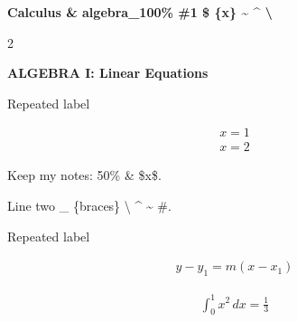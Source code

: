 \documentclass[a4paper]{article}
\begin{document}
\fontsize{9pt}{11.35pt}\selectfont
\setlength{\abovedisplayskip}{0pt}
\setlength{\belowdisplayskip}{0pt}
\setlength{\abovedisplayshortskip}{0pt}
\setlength{\belowdisplayshortskip}{0pt}
\setlength{\jot}{1pt}
\textbf{Calculus \& algebra\_100\% \#1 \$ \{x\} \textasciitilde{} \textasciicircum{} \textbackslash{}}\par
\begin{multicols}{2}
\raggedcolumns
\noindent\begin{minipage}{\linewidth}
\textbf{ALGEBRA I: Linear Equations}\par
Repeated label\par
\[\begin{gathered}
x=1\\
x=2
\end{gathered}\]
\end{minipage}\par\vspace{1pt}
Keep my notes: 50\% \& \$x\$.\par
Line two \_ \{braces\} \textbackslash{} \textasciicircum{} \textasciitilde{} \#.\par
\noindent\begin{minipage}{\linewidth}
Repeated label\par
\[\begin{gathered}
y-y_1=m(x-x_1)
\end{gathered}\]
\end{minipage}\par\vspace{1pt}
\noindent\begin{minipage}{\linewidth}
\[\begin{gathered}
\int_0^1 x^2\,dx=\frac{1}{3}
\end{gathered}\]
\end{minipage}\par\vspace{1pt}
\end{multicols}
\end{document}
